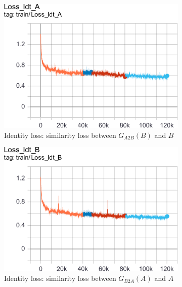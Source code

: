 \documentclass[10pt,twocolumn,letterpaper]{article}
\begin{document}
\begin{figure}[h]
   \centering
   \begin{subfigure}{.24\linewidth}
      \centering
      \includegraphics[width=\linewidth]{cyclegan-loss_idt_a}
      \caption{Identity loss: similarity loss between $G_{A2B}(B)$ and $B$}
   \end{subfigure}
   \begin{subfigure}{.24\linewidth}
      \centering
      \includegraphics[width=\linewidth]{cyclegan-loss_idt_b}
      \caption{Identity loss: similarity loss between $G_{B2A}(A)$ and $A$}
   \end{subfigure}
   \begin{subfigure}{.24\linewidth}
      \centering

\end{subfigure}
\end{figure}
\end{document}
